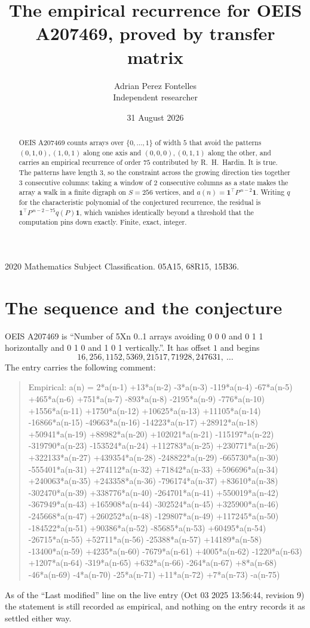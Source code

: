 \documentclass[11pt,a4paper]{article}
\title{The empirical recurrence for OEIS A207469, proved by transfer matrix}
\author{Adrian Perez Fontelles\\ \small Independent researcher}
\date{31 August 2026}
\theoremstyle{plain}
\theoremstyle{definition}
\begin{document}
\maketitle

\begin{abstract}
OEIS A207469 counts arrays over $\{0,\dots,1\}$ of width $5$ that avoid the patterns
$(0,1,0), (1,0,1)$ along one axis and $(0,0,0), (0,1,1)$ along the other, and carries an empirical recurrence of
order $75$ contributed by R.~H.~Hardin. It is true. The patterns have length $3$, so
the constraint across the growing direction ties together $3$ consecutive columns: taking a
window of $2$ consecutive columns as a state makes the array a walk in a finite digraph
on $S=256$ vertices, and $a(n)=\mathbf{1}^{\!\top}P^{\,n-2}\mathbf{1}$. Writing $q$
for the characteristic polynomial of the conjectured recurrence, the residual is
$\mathbf{1}^{\!\top}P^{\,n-2-75}q(P)\mathbf{1}$, which vanishes identically
beyond a threshold that the computation pins down exactly. Finite, exact, integer.
\end{abstract}

\noindent\small 2020 Mathematics Subject Classification. 05A15, 68R15, 15B36.\normalsize

\section{The sequence and the conjecture}

OEIS A207469 is ``Number of 5Xn 0..1 arrays avoiding 0 0 0 and 0 1 1 horizontally and 0 1 0 and 1 0 1 vertically.''. It has offset
$1$ and begins
\[
16, 256, 1152, 5369, 21517, 71928, 247631,\ \dots
\]
The entry carries the following comment:
\begin{quote}\small
Empirical: a(n) = 2*a(n-1) +13*a(n-2) -3*a(n-3) -119*a(n-4) -67*a(n-5) +465*a(n-6) +751*a(n-7) -893*a(n-8) -2195*a(n-9) -776*a(n-10) +1556*a(n-11) +1750*a(n-12) +10625*a(n-13) +11105*a(n-14) -16866*a(n-15) -49663*a(n-16) -14223*a(n-17) +28912*a(n-18) +50941*a(n-19) +88982*a(n-20) +102021*a(n-21) -115197*a(n-22) -319790*a(n-23) -153524*a(n-24) +112783*a(n-25) +230771*a(n-26) +322133*a(n-27) +439354*a(n-28) -248822*a(n-29) -665730*a(n-30) -555401*a(n-31) +274112*a(n-32) +71842*a(n-33) +596696*a(n-34) +240063*a(n-35) +243358*a(n-36) -796174*a(n-37) +83610*a(n-38) -302470*a(n-39) +338776*a(n-40) -264701*a(n-41) +550019*a(n-42) -367949*a(n-43) +165908*a(n-44) -302524*a(n-45) +325900*a(n-46) -245668*a(n-47) +260252*a(n-48) -129807*a(n-49) +117245*a(n-50) -184522*a(n-51) +90386*a(n-52) -85685*a(n-53) +60495*a(n-54) -26715*a(n-55) +52711*a(n-56) -25388*a(n-57) +14189*a(n-58) -13400*a(n-59) +4235*a(n-60) -7679*a(n-61) +4005*a(n-62) -1220*a(n-63) +1207*a(n-64) -319*a(n-65) +632*a(n-66) -264*a(n-67) +8*a(n-68) -46*a(n-69) -4*a(n-70) -25*a(n-71) +11*a(n-72) +7*a(n-73) -a(n-75)
\end{quote}
As of the ``Last modified'' line on the live entry (Oct 03 2025 13:56:44, revision
9) the statement is still recorded as empirical, and nothing on the entry
records it as settled either way.
\end{document}
